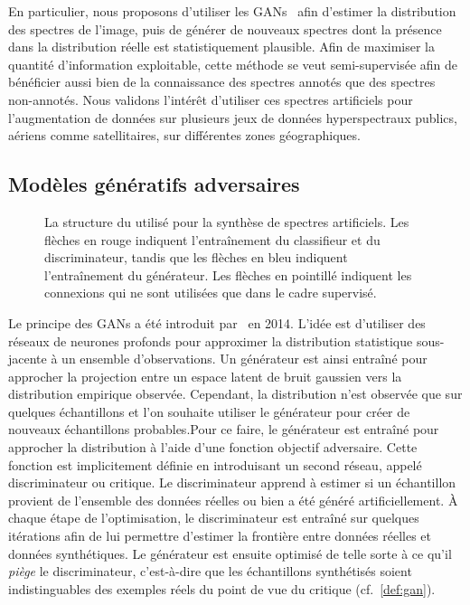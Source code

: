 En particulier, nous proposons d'utiliser les \glspl{GAN}~\cite{goodfellow_generative_2014} afin d'estimer la distribution des spectres de l'image, puis de générer de nouveaux spectres dont la présence dans la distribution réelle est statistiquement plausible. Afin de maximiser la quantité d'information exploitable, cette méthode se veut semi-supervisée afin de bénéficier aussi bien de la connaissance des spectres annotés que des spectres non-annotés. Nous validons l'intérêt d'utiliser ces spectres artificiels pour l'augmentation de données sur plusieurs jeux de données hyperspectraux publics, aériens comme satellitaires, sur différentes zones géographiques.

\subsection{Modèles génératifs adversaires}

\begin{figure}
		\resizebox{\textwidth}{!}{}
    \caption[La structure de  utilisée pour la synthèse de spectres artificiels.]{La structure du  utilisé pour la synthèse de spectres artificiels. Les flèches en \textcolor{BrickRed}{rouge} indiquent l'entraînement du classifieur et du discriminateur, tandis que les flèches en \textcolor{NavyBlue}{bleu} indiquent l'entraînement du générateur. Les flèches en pointillé indiquent les connexions qui ne sont utilisées que dans le cadre supervisé.}
    \label{fig:gan}
\end{figure}

Le principe des \glspl{GAN} a été introduit par~\citet{goodfellow_generative_2014} en 2014. L'idée est d'utiliser des réseaux de neurones profonds pour approximer la distribution statistique sous-jacente à un ensemble d'observations. Un générateur est ainsi entraîné pour approcher la projection entre un espace latent de bruit gaussien vers la distribution empirique observée. Cependant, la distribution n'est observée que sur quelques échantillons et l'on souhaite utiliser le générateur pour créer de nouveaux échantillons probables.Pour ce faire, le générateur est entraîné pour approcher la distribution à l'aide d'une fonction objectif adversaire. Cette fonction est implicitement définie en introduisant un second réseau, appelé discriminateur ou critique. Le discriminateur apprend à estimer si un échantillon provient de l'ensemble des données réelles ou bien a été généré artificiellement. À chaque étape de l'optimisation, le discriminateur est entraîné sur quelques itérations afin de lui permettre d'estimer la frontière entre données réelles et données synthétiques. Le générateur est ensuite optimisé de telle sorte à ce qu'il \emph{piège} le discriminateur, c'est-à-dire que les échantillons synthétisés soient indistinguables des exemples réels du point de vue du critique (cf.~\cref{def:gan}).

